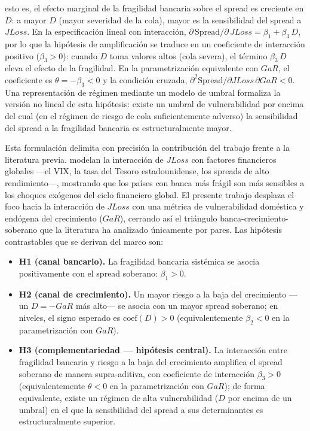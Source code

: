 esto es, el efecto marginal de la fragilidad bancaria sobre el spread es creciente en $D$: a mayor $D$ (mayor severidad de la cola), mayor es la sensibilidad del spread a $JLoss$. En la especificación lineal con interacción, $\partial\, \mathrm{Spread}/\partial\, JLoss = \beta_{1} + \beta_{3}\,D$, por lo que la hipótesis de amplificación se traduce en un coeficiente de interacción positivo ($\beta_{3} > 0$): cuando $D$ toma valores altos (cola severa), el término $\beta_{3}\,D$ eleva el efecto de la fragilidad. En la parametrización equivalente con $GaR$, el coeficiente es $\theta=-\beta_3<0$ y la condición cruzada, $\partial^2\mathrm{Spread}/\partial JLoss\,\partial GaR<0$. Una representación de régimen mediante un modelo de umbral \citep{Hansen2000} formaliza la versión no lineal de esta hipótesis: existe un umbral de vulnerabilidad por encima del cual (en el régimen de riesgo de cola suficientemente adverso) la sensibilidad del spread a la fragilidad bancaria es estructuralmente mayor.

Esta formulación delimita con precisión la contribución del trabajo frente a la literatura previa. \citet{Chari2024b} modelan la interacción de $JLoss$ con factores financieros globales —el VIX, la tasa del Tesoro estadounidense, los spreads de alto rendimiento—, mostrando que los países con banca más frágil son más sensibles a los choques exógenos del ciclo financiero global. El presente trabajo desplaza el foco hacia la interacción de $JLoss$ con una métrica de vulnerabilidad doméstica y endógena del crecimiento ($GaR$), cerrando así el triángulo banca-crecimiento-soberano que la literatura ha analizado únicamente por pares. Las hipótesis contrastables que se derivan del marco son:

\begin{itemize}
    \item \textbf{H1 (canal bancario).} La fragilidad bancaria sistémica se asocia positivamente con el spread soberano: $\beta_{1} > 0$.
    \item \textbf{H2 (canal de crecimiento).} Un mayor riesgo a la baja del crecimiento —un $D=-GaR$ más alto— se asocia con un mayor spread soberano; en niveles, el signo esperado es $\text{coef}(D) > 0$ (equivalentemente $\beta_{2} < 0$ en la parametrización con $GaR$).
    \item \textbf{H3 (complementariedad — hipótesis central).} La interacción entre fragilidad bancaria y riesgo a la baja del crecimiento amplifica el spread soberano de manera supra-aditiva, con coeficiente de interacción $\beta_{3} > 0$ (equivalentemente $\theta < 0$ en la parametrización con $GaR$); de forma equivalente, existe un régimen de alta vulnerabilidad ($D$ por encima de un umbral) en el que la sensibilidad del spread a sus determinantes es estructuralmente superior.
\end{itemize}

